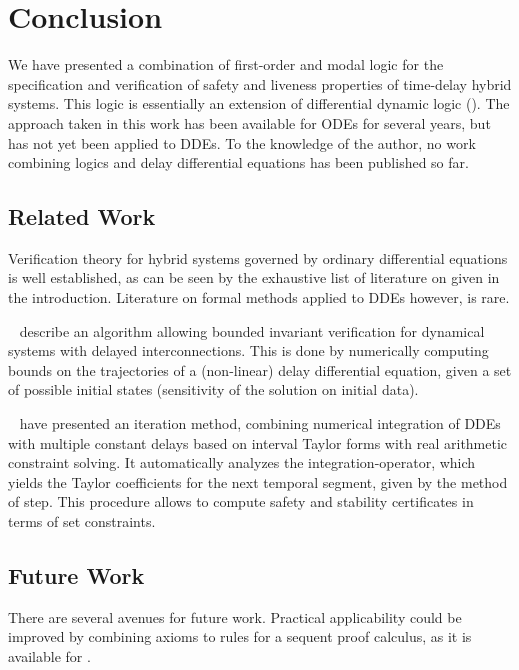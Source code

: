 \chapter{Conclusion}
    \label{ch:conclusion}

    We have presented a combination of first-order and modal logic for the specification and verification of safety and liveness properties of time-delay hybrid systems.
    This logic is essentially an extension of differential dynamic logic (\dL).
    The approach taken in this work has been available for ODEs for several years, but has not yet been applied to DDEs. 
    To the knowledge of the author, no work combining logics and delay differential equations has been published so far.

    \section{Related Work}
        Verification theory for hybrid systems governed by ordinary differential equations is well established, as can be seen by the exhaustive list of literature on \dL given in the introduction.
        Literature on formal methods applied to DDEs however, is rare.
        
        \citeauthor*{Huang16BoundedVerificationNNDS}~\cite{Huang16BoundedVerificationNNDS} describe an algorithm allowing bounded invariant verification for dynamical systems with delayed interconnections.
        This is done by numerically computing bounds on the trajectories of a (non-linear) delay differential equation, given a set of possible initial states (sensitivity of the solution on initial data).
        
        \citeauthor{Zou15AutomaticVerifDDEs}~\cite{Zou15AutomaticVerifDDEs} have presented an iteration method, combining numerical integration of DDEs with multiple constant delays based on interval Taylor forms
        with real arithmetic constraint solving.
        It automatically analyzes the integration-operator, which yields the Taylor coefficients for the next temporal segment, given by the method of step.
        This procedure allows to compute safety and stability certificates in terms of set constraints.

    \section{Future Work}
        There are several avenues for future work. Practical applicability could be improved by combining axioms to rules for a sequent proof calculus, as it is available for \dL.

